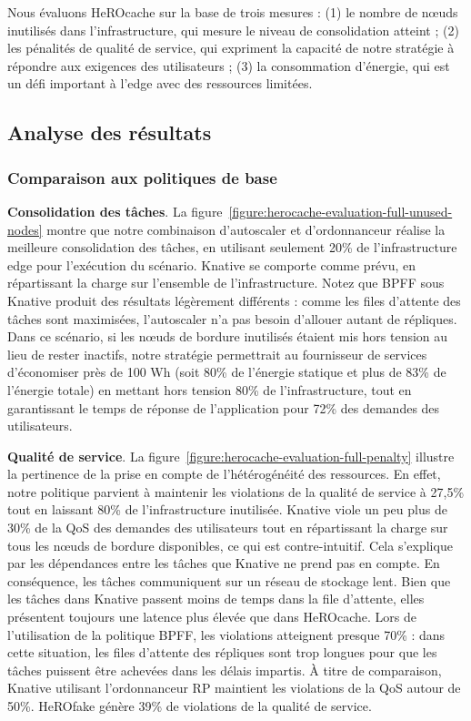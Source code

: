Nous évaluons HeROcache sur la base de trois mesures : (1) le nombre de nœuds inutilisés dans l'infrastructure, qui mesure le niveau de consolidation atteint ; (2) les pénalités de qualité de service, qui expriment la capacité de notre stratégie à répondre aux exigences des utilisateurs ; (3) la consommation d'énergie, qui est un défi important à l'edge avec des ressources limitées.

\subsection{Analyse des résultats}

\subsubsection{Comparaison aux politiques de base}

\textbf{Consolidation des tâches}. La figure~\ref{figure:herocache-evaluation-full-unused-nodes} montre que notre combinaison d'autoscaler et d'ordonnanceur réalise la meilleure consolidation des tâches, en utilisant seulement 20\% de l'infrastructure edge pour l'exécution du scénario. Knative se comporte comme prévu, en répartissant la charge sur l'ensemble de l'infrastructure. Notez que BPFF sous Knative produit des résultats légèrement différents : comme les files d'attente des tâches sont maximisées, l'autoscaler n'a pas besoin d'allouer autant de répliques. Dans ce scénario, si les nœuds de bordure inutilisés étaient mis hors tension au lieu de rester inactifs, notre stratégie permettrait au fournisseur de services d'économiser près de 100 Wh (soit 80\% de l'énergie statique et plus de 83\% de l'énergie totale) en mettant hors tension 80\% de l'infrastructure, tout en garantissant le temps de réponse de l'application pour 72\% des demandes des utilisateurs.

\textbf{Qualité de service}. La figure~\ref{figure:herocache-evaluation-full-penalty} illustre la pertinence de la prise en compte de l'hétérogénéité des ressources. En effet, notre politique parvient à maintenir les violations de la qualité de service à 27,5\% tout en laissant 80\% de l'infrastructure inutilisée. Knative viole un peu plus de 30\% de la QoS des demandes des utilisateurs tout en répartissant la charge sur tous les nœuds de bordure disponibles, ce qui est contre-intuitif. Cela s'explique par les dépendances entre les tâches que Knative ne prend pas en compte. En conséquence, les tâches communiquent sur un réseau de stockage lent. Bien que les tâches dans Knative passent moins de temps dans la file d'attente, elles présentent toujours une latence plus élevée que dans HeROcache. Lors de l'utilisation de la politique BPFF, les violations atteignent presque 70\% : dans cette situation, les files d'attente des répliques sont trop longues pour que les tâches puissent être achevées dans les délais impartis. À titre de comparaison, Knative utilisant l'ordonnanceur RP maintient les violations de la QoS autour de 50\%. HeROfake génère 39\% de violations de la qualité de service.

